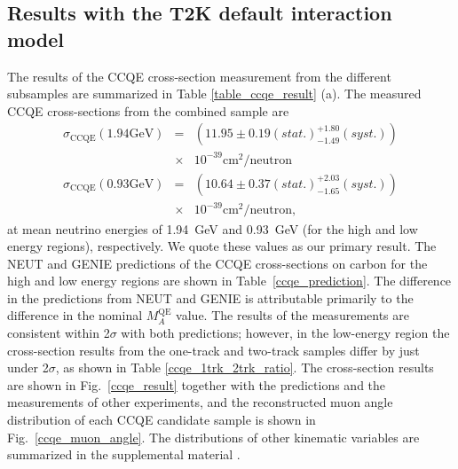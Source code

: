 \documentclass[%
 reprint,
superscriptaddress,
 amsmath,amssymb,
 aps,
]{revtex4-1}
\begin{document}
\subsection{Results with the T2K default interaction model}
The results of the CCQE cross-section measurement from the different subsamples are summarized in Table \ref{table_ccqe_result} (a).
The measured CCQE cross-sections from the combined sample are
\begin{eqnarray}
\sigma_{\mathrm{CCQE}}(1.94\mathrm{GeV}) &=& (11.95\pm 0.19(stat.)_{-1.49}^{+1.80}
(syst.))\nonumber\\
&\times& 10^{-39}\mathrm{cm}^2/\mathrm{neutron}\\
\sigma_{\mathrm{CCQE}}(0.93\mathrm{GeV}) &=& (10.64\pm 0.37(stat.)_{-1.65}^{+2.03}
(syst.))\nonumber\\
&\times& 10^{-39}\mathrm{cm}^2/\mathrm{neutron},
\end{eqnarray}
at mean neutrino energies of 1.94~GeV and 0.93~GeV (for the high and low energy regions), respectively.
We quote these values as our primary result.
The NEUT and GENIE predictions of the CCQE cross-sections on carbon for the high and low energy regions are shown in Table~\ref{ccqe_prediction}. The difference in the predictions from NEUT and GENIE is attributable primarily to the difference in the nominal $M_A^{\mathrm{QE}}$ value.
The results of the measurements are consistent within 2$\sigma$ with both predictions;
however, in the low-energy region the cross-section results from the one-track and two-track samples differ by just under 2$\sigma$, as shown in Table \ref{ccqe_1trk_2trk_ratio}. 
The cross-section results are shown in Fig.\ \ref{ccqe_result} together with the predictions and the measurements of other experiments, and the reconstructed muon angle distribution of each CCQE candidate sample is shown in Fig.\ \ref{ccqe_muon_angle}. The distributions of other kinematic variables are summarized in the supplemental material \cite{suppl_material}.
\end{document}
